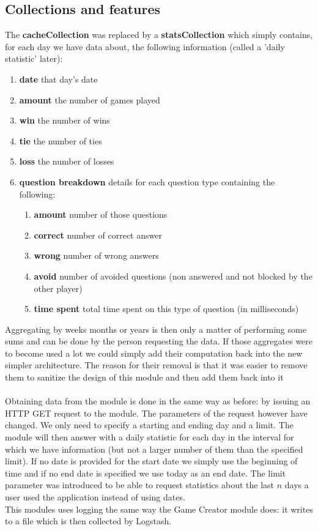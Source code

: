 \subsection{Collections and features}
The \textbf{cacheCollection} was replaced by a \textbf{statsCollection} which simply contains, for each day we have data about, the following information (called a 'daily statistic' later):
\begin{enumerate}
	\item \textbf{date} that day's date
	\item \textbf{amount} the number of games played
	\item \textbf{win} the number of wins
	\item \textbf{tie} the number of ties
	\item \textbf{loss} the number of losses
	\item \textbf{question breakdown} details for each question type containing the following:
	\begin{enumerate}
		\item \textbf{amount} number of those questions
		\item \textbf{correct} number of correct answer
		\item \textbf{wrong} number of wrong answers
		\item \textbf{avoid} number of avoided questions (non answered and not blocked by the other player)
		\item \textbf{time spent} total time spent on this type of question (in milliseconds)
	\end{enumerate}
\end{enumerate}
Aggregating by weeks months or years is then only a matter of performing some sums and can be done by the person requesting the data. If those aggregates were to become used a lot we could simply add their computation back into the new simpler architecture. The reason for their removal is that it was easier to remove them to sanitize the design of this module and then add them back into it\\\\
Obtaining data from the module is done in the same way as before: by issuing an HTTP GET request to the module. The parameters of the request however have changed. We only need to specify a starting and ending day and a limit. The module will then answer with a daily statistic for each day in the interval for which we have information (but not a larger number of them than the specified limit). If no date is provided for the start date we simply use the beginning of time and if no end date is specified we use today as an end date. The limit parameter was introduced to be able to request statistics about the last $n$ days a user used the application instead of using dates.\\
This modules uses logging the same way the Game Creator module does: it writes to a file which is then collected by Logstash.


